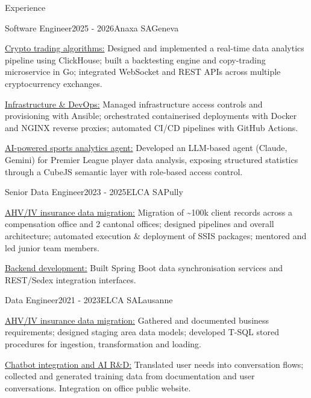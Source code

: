 \documentclass[
	a4paper, %
	10pt, %
]{resume} %
\newcommand{\lead}[1]{{\underline{#1}}}
\begin{document}
\begin{rSection}{Experience}

	\begin{rSubsection}{Software Engineer}{2025 - 2026}{Anaxa SA}{Geneva}
		\item \lead{Crypto trading algorithms:} Designed and implemented a real-time data analytics pipeline using ClickHouse; built a backtesting engine and copy-trading microservice in Go; integrated WebSocket and REST APIs across multiple cryptocurrency exchanges.
		\item \lead{Infrastructure \& DevOps:} Managed infrastructure access controls and provisioning with Ansible; orchestrated containerised deployments with Docker and NGINX reverse proxies; automated CI/CD pipelines with GitHub Actions.
		\item \lead{AI-powered sports analytics agent:} Developed an LLM-based agent (Claude, Gemini) for Premier League player data analysis, exposing structured statistics through a CubeJS semantic layer with role-based access control.
	\end{rSubsection}

	\begin{rSubsection}{Senior Data Engineer}{2023 - 2025}{ELCA SA}{Pully}
		\item \lead{AHV/IV insurance data migration:} Migration of \textasciitilde100k client records across a compensation office and 2 cantonal offices; designed pipelines and overall architecture; automated execution \& deployment of SSIS packages; mentored and led junior team members.
		\item \lead{Backend development:} Built Spring Boot data synchronisation services and REST/Sedex integration interfaces.
	\end{rSubsection}


	\begin{rSubsection}{Data Engineer}{2021 - 2023}{ELCA SA}{Lausanne}
		\item \lead{AHV/IV insurance data migration:} Gathered and documented business requirements; designed staging area data models; developed T-SQL stored procedures for ingestion, transformation and loading.
		\item \lead{Chatbot integration and AI R\&D:} Translated user needs into conversation flows; collected and generated training data from documentation and user conversations. Integration on office public website.
	\end{rSubsection}


\end{rSection}
\end{document}
